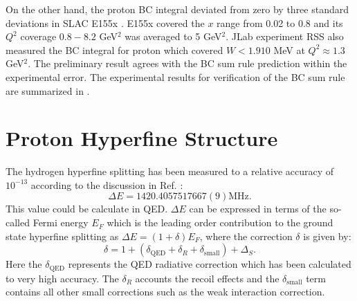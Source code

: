 On the other hand, the proton BC integral deviated from zero by three standard deviations in SLAC E155x \cite{Abe1998}. E155x covered the $x$ range from 0.02 to 0.8 and its $Q^2$ coverage $0.8-8.2$ GeV${}^2$ was averaged to 5 GeV${}^2$. JLab experiment RSS also measured the BC integral for proton which covered $W<1.910$ MeV at $Q^2\approx1.3$ GeV${}^2$. The preliminary result agrees with the BC sum rule prediction within the experimental error. The experimental results for verification of the BC sum rule are summarized in .

\section{Proton Hyperfine Structure}
\label{C4S4}

The hydrogen hyperfine splitting has been measured to a relative accuracy of $10^{-13}$ according to the discussion in Ref. \cite{Nazaryan2006}:
\begin{equation} \label{C4S4E1}
\Delta E = 1420.405 751 766 7(9) \text{MHz}.
\end{equation}
This value could be calculate in QED. $\Delta E$ can be expressed in terms of the so-called Fermi energy $E_F$ which is the leading order contribution to the ground state hyperfine splitting as $\Delta E = (1+\delta)E_F$, where the correction $\delta$ is given by:
\begin{equation} \label{C4S4E2}
\delta = 1+(\delta_{\mathrm{QED}}+\delta_R+\delta_{\mathrm{small}})+\Delta_S.
\end{equation}
Here the $\delta_{\mathrm{QED}}$ represents the QED radiative correction which has been calculated to very high accuracy. The $\delta_R$ accounts the recoil effects and the $\delta_{\mathrm{small}}$ term contains all other small corrections such as the weak interaction correction.

